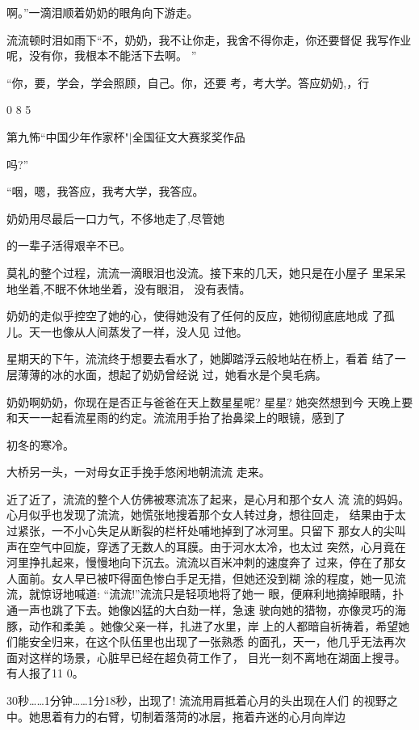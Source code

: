 \documentclass{article}
\begin{document}
啊。”一滴泪顺着奶奶的眼角向下游走。 

流流顿时泪如雨下“不，奶奶，我不让你走，我舍不得你走，你还要督促
我写作业呢，没有你，我根本不能活下去啊。
” 

“你，要，学会，学会照顾，自己。你，还要
考，考大学。答应奶奶,，行 


0 8 5 

第九怖“中国少年作家杯"|全国征文大赛浆奖作品

吗?” 


“咽，嗯，我答应，我考大学，我答应。 

奶奶用尽最后一口力气，不侈地走了,尽管她

\newpage
的一辈子活得艰辛不已。 

莫礼的整个过程，流流一滴眼泪也没流。接下来的几天，她只是在小屋子
里呆呆地坐着,不眠不休地坐着，没有眼泪，
没有表情。 

奶奶的走似乎控空了她的心，使得她没有了任何的反应，她彻彻底底地成
了孤儿。天一也像从人间蒸发了一样，没人见
过他。 

星期天的下午，流流终于想要去看水了，她脚踏浮云般地站在桥上，看着
结了一层薄薄的冰的水面，想起了奶奶曾经说
过，她看水是个臭毛病。 

奶奶啊奶奶，你现在是否正与爸爸在天上数星星呢? 星星? 她突然想到今
天晚上要和天一一起看流星雨的约定。流流用手抬了抬鼻梁上的眼镜，感到了

\newpage

初冬的寒冷。 

大桥另一头，一对母女正手挽手悠闲地朝流流
走来。 

近了近了，流流的整个人仿佛被寒流冻了起来，是心月和那个女人  流
流的妈妈。心月似乎也发现了流流，她慌张地搜着那个女人转过身，想往回走，
结果由于太过紧张，一不小心失足从断裂的栏杆处哺地掉到了冰河里。只留下
那女人的尖叫声在空气中回旋，穿透了无数人的耳膜。由于河水太冷，也太过
突然，心月竟在河里挣扎起来，慢慢地向下沉去。流流以百米冲刺的速度奔了
过来，停在了那女人面前。女人早已被吓得面色惨白手足无措，但她还没到糊
涂的程度，她一见流流，就惊讶地喊道: “流流!”流流只是轻项地将了她一
眼，便麻利地摘掉眼睛，扑通一声也跳了下去。她像凶猛的大白劾一样，急速
驶向她的猎物，亦像灵巧的海豚，动作和柔美
\newpage
。她像父亲一样，扎进了水里，岸
上的人都暗自祈祷着，希望她们能安全归来，在这个队伍里也出现了一张熟悉
的面孔，天一，他几乎无法再次面对这样的场景，心脏早已经在超负荷工作了，
目光一刻不离地在湖面上搜寻。有人报了11
0。 

30秒……1分钟……1分18秒，出现了! 流流用肩抵着心月的头出现在人们
的视野之中。她思着有力的右臂，切制着落菏的冰层，拖着卉迷的心月向岸边
\end{document}
